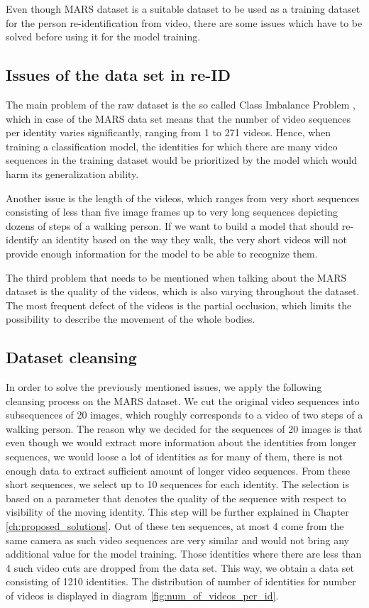 Even though MARS dataset is a suitable dataset to be used as a training dataset for the person re-identification from video, there are some issues which have to be solved before using it for the model training. 

\subsection{Issues of the data set in re-ID}

The main problem of the raw dataset is the so called Class Imbalance Problem \cite{class_imbalance}, which in case of the MARS data set means that the number of video sequences per identity varies significantly, ranging from 1 to 271 videos. Hence, when training a classification model, the identities for which there are many video sequences in the training dataset would be prioritized by the model which would harm its generalization ability. 

Another issue is the length of the videos, which ranges from very short sequences consisting of less than five image frames up to very long sequences depicting dozens of steps of a walking person. If we want to build a model that should re-identify an identity based on the way they walk, the very short videos will not provide enough information for the model to be able to recognize them.

The third problem that needs to be mentioned when talking about the MARS dataset is the quality of the videos, which is also varying throughout the dataset. The most frequent defect of the videos is the partial occlusion, which limits the possibility to describe the movement of the whole bodies.

\subsection{Dataset cleansing} \label{dataset:cleansing}
In order to solve the previously mentioned issues, we apply the following cleansing process on the MARS dataset. We cut the original video sequences into subsequences of 20 images, which roughly corresponds to a video of two steps of a walking person. The reason why we decided for the sequences of 20 images is that even though we would extract more information about the identities from longer sequences, we would loose a lot of identities as for many of them, there is not enough data to extract sufficient amount of longer video sequences. From these short sequences, we select up to 10 sequences for each identity. The selection is based on a parameter that denotes the quality of the sequence with respect to visibility of the moving identity. This step will be further explained in Chapter \ref{ch:proposed_solutions}. Out of these ten sequences, at most 4 come from the same camera as such video sequences are very similar and would not bring any additional value for the model training. Those identities where there are less than 4 such video cuts are dropped from the data set. This way, we obtain a data set consisting of 1210 identities. The distribution of number of identities for number of videos is displayed in diagram \ref{fig:num_of_videos_per_id}.

